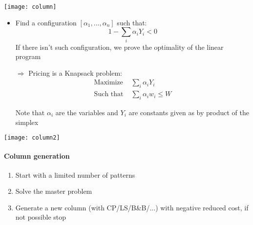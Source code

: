 \begin{center}
\texttt{[image: column]}
\end{center}

\begin{itemize}
    \item Find a configuration $[\alpha_1, ..., \alpha_n]$ such that:
        $$1 - \sum_i \alpha_i Y_i < 0$$
        If there isn't such configuration, we prove the optimality of the
        linear program

    \item[$\Rightarrow$] Pricing is a Knapsack problem:
        \begin{eqnarray*}
            \textrm{Maximize } & \sum_i \alpha_i Y_i\\
            \textrm{Such that } & \sum_i \alpha_i w_i \leq W
        \end{eqnarray*}

        Note that $\alpha_i$ are the variables and $Y_i$ are constants
        given as by product of the simplex
\end{itemize}

\begin{center}
\texttt{[image: column2]}
\end{center}


\paragraph{Column generation}
\begin{enumerate}
    \item Start with a limited number of patterns
    \item Solve the master problem 
    \item  Generate a new column (with CP/LS/B\&B/...) with negative reduced cost, if
        not possible stop
\end{enumerate}

